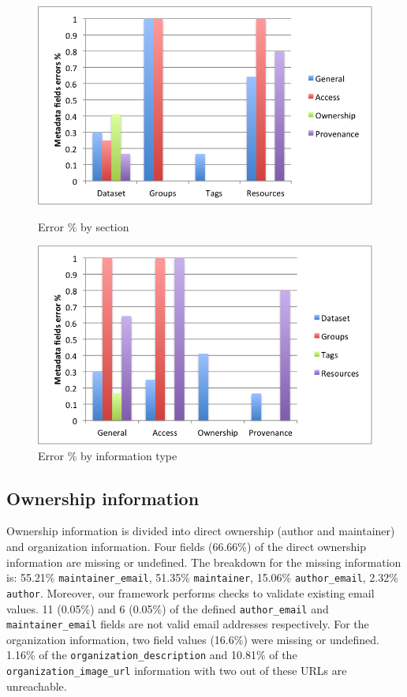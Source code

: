 \documentclass[runningheads,a4paper]{llncs}
\begin{document}
\begin{figure}
 \parbox{7cm}{\hspace*{-.2in}
 \includegraphics[width=.95\linewidth]{metadata_noise_by_section.png}
 \captionsetup{textfont=small,singlelinecheck=off,justification=centering}
 \caption{Error \% by section}
 \label{fig:2}}
 \qquad
 \begin{minipage}{7cm}\hspace*{-.6in}
 \includegraphics[width=.95\linewidth]{metadata_noise_by_metadata_type.png}
 \captionsetup{textfont=small,singlelinecheck=off,justification=raggedright}
 \caption{Error \% by information type}
 \label{fig:3}
 \end{minipage}
\end{figure}

\subsection{Ownership information}
Ownership information is divided into direct ownership (author and maintainer) and organization information. Four fields (66.66\%) of the direct ownership information are missing or undefined. The breakdown for the missing information is: 55.21\% \texttt{maintainer\_email}, 51.35\% \texttt{maintainer}, 15.06\% \texttt{author\_email}, 2.32\% \texttt{author}. Moreover, our framework performs checks to validate existing email values. 11 (0.05\%) and 6 (0.05\%) of the defined \texttt{author\_email} and \texttt{maintainer\_email} fields are not valid email addresses respectively. For the organization information, two field values (16.6\%) were missing or undefined. 1.16\% of the \texttt{organization\_description} and 10.81\% of the \texttt{organization\-\_image\_url} information with two out of these URLs are unreachable.
\end{document}
